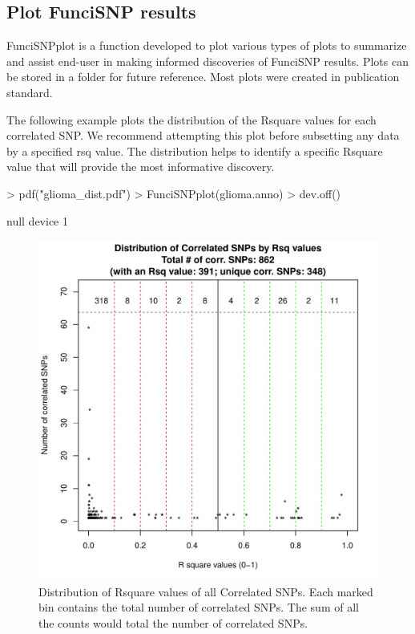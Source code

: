\documentclass[a4paper]{article}
\begin{document}
\newpage
\subsection*{Plot FunciSNP results}
FunciSNPplot is a function developed to plot various types of plots to summarize
 and assist end-user in making informed discoveries of FunciSNP results. Plots 
 can be stored in a folder for future reference. Most plots were created in 
 publication standard.

The following example plots the distribution of the Rsquare values for each
correlated SNP. We recommend attempting this plot before subsetting any data 
by a specified rsq value.  The distribution helps to identify a specific Rsquare
 value that will provide the most informative discovery.
\begin{Schunk}
\begin{Sinput}
> pdf("glioma_dist.pdf")
> FunciSNPplot(glioma.anno)
> dev.off()
\end{Sinput}
\begin{Soutput}
null device 
          1 
\end{Soutput}
\end{Schunk}
\begin{figure}[ht!]
\begin{center}
\includegraphics{glioma_dist.pdf}
\caption{\label{fig:glioma_dist.pdf} Distribution of Rsquare values of all 
Correlated SNPs. Each marked bin contains the total number of correlated SNPs. The
 sum of all the counts would total the number of correlated SNPs.}
{\footnotesize{}}
\end{center}
\end{figure}
\end{document}
